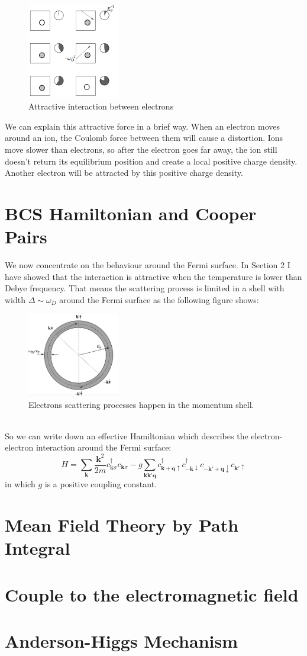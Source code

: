 \documentclass{article}
\newcommand{\mtq}{\mathbf{q}}
\newcommand{\mtk}{\mathbf{k}}
\newcommand{\uspin}{\uparrow}
\newcommand{\dspin}{\downarrow}
\begin{document}
\begin{figure}[!htp]
\centering
\includegraphics[width=4cm]{./figures/pic1.png}
\caption{Attractive interaction between electrons}
\end{figure}

We can explain this attractive force in a brief way. When an electron moves around an ion, the Coulomb force between them will cause a distortion. Ions move slower than electrons, so after the electron goes far away, the ion still doesn't return its equilibrium position and create a local positive charge density. Another electron will be attracted by this positive charge density.

\section{BCS Hamiltonian and Cooper Pairs}
We now concentrate on the behaviour around the Fermi surface. In Section 2 I have showed that the interaction is attractive when the temperature is lower than Debye frequency. That means the scattering process is limited in a shell with width $\Delta \sim \omega_D$ around the Fermi surface as the following figure shows:
\begin{figure}[!htp]
\centering
\includegraphics[width = 4cm]{./figures/pic2.png}
\caption{Electrons scattering processes happen in the momentum shell.}
\end{figure}\\
So we can write down an effective Hamiltonian which describes the electron-electron interaction around the Fermi surface:
\begin{equation}
H = \sum_{\mtk}\frac{\mtk^2}{2m}c^\dagger_{\mtk\sigma}c_{\mtk\sigma} - g\sum_{\mtk\mtk'\mtq} c^\dagger_{\mtk+\mtq\uspin}c^\dagger_{-\mtk\dspin}c_{-\mtk'+\mtq \dspin}c_{\mtk'\uspin}
\end{equation}
in which $g$ is a positive coupling constant. 

\section{Mean Field Theory by Path Integral}

\section{Couple to the electromagnetic field}

\section{Anderson-Higgs Mechanism}
\end{document}
